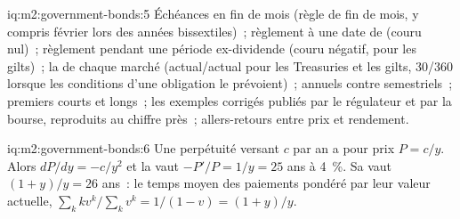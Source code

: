 \begin{solution}{iq:m2:government-bonds:5}
Échéances en fin de mois (règle de fin de mois, y compris février lors des
années bissextiles)~; règlement à une date de  (couru nul)~; règlement pendant une
période ex-dividende (couru négatif, pour les gilts)~; la  de chaque marché
(actual/actual pour les Treasuries et les gilts, 30/360 lorsque les conditions d'une obligation
le prévoient)~;
 annuels contre semestriels~; premiers  courts et longs~; les
exemples corrigés publiés par le régulateur et par la bourse, reproduits au
chiffre près~; allers-retours entre prix et rendement.
\end{solution}

\begin{solution}{iq:m2:government-bonds:6}
Une perpétuité versant $c$ par an a pour prix $P = c/y$. Alors $dP/dy = -c/y^2$ et
la  vaut $-P'/P = 1/y = 25$ ans à 4~\%. Sa 
vaut $(1 + y)/y = 26$ ans~: le temps moyen des paiements pondéré par leur valeur actuelle,
$\sum_k k v^k / \sum_k v^k = 1/(1 - v) = (1+y)/y$.
\end{solution}
